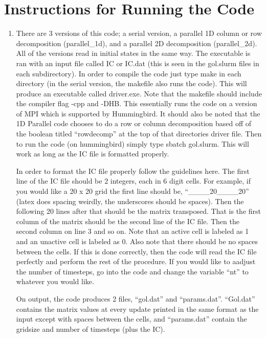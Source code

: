 \documentclass{article}
\begin{document}
\section*{Instructions for Running the Code}

\begin{enumerate}[label=\alph*)]
\item There are 3 versions of this code; a serial version, a parallel 1D column
or row
decomposition (parallel\_1d), and a parallel 2D decomposition (parallel\_2d). All of the versions read in
initial states in the same way. The executable is ran with an input file called
IC or IC.dat (this is seen in the gol.slurm files in each subdirectory). In
order to compile the code just type make in each directory (in the serial
version, the makefile also runs the code). This will produce an executable
called driver.exe. Note that the makefile should include the compiler flag -cpp
and -DHB. This essentially runs the code on a version of MPI which is supported
by Hummingbird. It should also be noted that the 1D Parallel code chooses to do
a row or column decomposition based off of the boolean titled ``rowdecomp'' at
the top of that directories driver file. Then to run the code (on hummingbird) simply type sbatch
gol.slurm. This will work as long as the IC file is formatted properly. 

In order to format the IC file properly follow the guidelines here. The first
line of the IC file should be 2 integers, each in 6 digit cells. For example, if
you would like a 20 x 20 grid the first line should be, ``\_\_\_\_20\_\_\_\_20'' (latex
does spacing weirdly, the underscores should be spaces). Then the following 20
lines after that should be the matrix transposed. That is the first column of
the matrix should be the second line of the IC file. Then the second column on
line 3 and so on. Note that an active cell is labeled as 1 and an unactive cell
is labeled as 0. Also note that there should be no spaces between the cells. If
this is done correctly, then the code will read the IC file perfectly and
perform the rest of the procedure. If you would like to aadjust the number of
timesteps, go into the code and change the variable ``nt'' to whatever you would
like. 

On output, the code produces 2 files, ``gol.dat'' and ``params.dat''.
``Gol.dat'' contains the matrix values at every update printed in the same
format as the input except with spaces between the cells, and ``params.dat''
contain the gridsize and number of timesteps (plus the IC). 


\end{enumerate}
\end{document}
